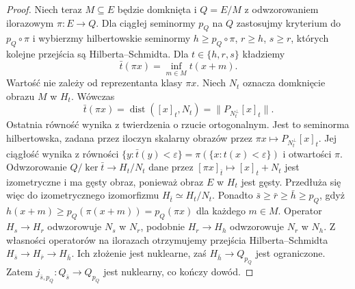 \begin{proof}
Niech teraz $M\subseteq E$ będzie domknięta i
$Q=E/M$ z odwzorowaniem ilorazowym $\pi:E\to Q$.
Dla ciągłej seminormy $p_Q$ na $Q$ zastosujmy kryterium
do $p_Q\circ\pi$ i wybierzmy hilbertowskie seminormy
$h\ge p_Q\circ\pi$, $r\ge h$, $s\ge r$,
których kolejne przejścia są Hilberta--Schmidta.
Dla $t\in\{h,r,s\}$ kładziemy
\[
 \bar t(\pi x)=\inf_{m\in M}t(x+m).
\]
Wartość nie zależy od reprezentanta klasy $\pi x$.
Niech $N_t$ oznacza domknięcie obrazu $M$ w $H_t$.
Wówczas
\[
 \bar t(\pi x)=\operatorname{dist}([x]_t,N_t)
 =\|P_{N_t^\perp}[x]_t\|.
\]
Ostatnia równość wynika z twierdzenia o rzucie
ortogonalnym. Jest to seminorma hilbertowska, zadana
przez iloczyn skalarny obrazów przez
$\pi x\mapsto P_{N_t^\perp}[x]_t$.
Jej ciągłość wynika z równości
$\{y:\bar t(y)<\varepsilon\}=
\pi(\{x:t(x)<\varepsilon\})$ i otwartości $\pi$.
Odwzorowanie $Q/\ker\bar t\to H_t/N_t$ dane przez
$[\pi x]_{\bar t}\mapsto [x]_t+N_t$ jest izometryczne
i ma gęsty obraz, ponieważ obraz $E$ w $H_t$ jest gęsty.
Przedłuża się więc do izometrycznego izomorfizmu
$H_{\bar t}\simeq H_t/N_t$.
Ponadto $\bar s\ge\bar r\ge\bar h\ge p_Q$,
gdyż $h(x+m)\ge p_Q(\pi(x+m))=p_Q(\pi x)$
dla każdego $m\in M$.
Operator $H_s\to H_r$ odwzorowuje $N_s$ w $N_r$,
podobnie $H_r\to H_h$ odwzorowuje $N_r$ w $N_h$.
Z własności operatorów na ilorazach otrzymujemy
przejścia Hilberta--Schmidta
$H_{\bar s}\to H_{\bar r}\to H_{\bar h}$.
Ich złożenie jest nuklearne, zaś
$H_{\bar h}\to Q_{p_Q}$ jest ograniczone. Zatem
$j_{\bar s,p_Q}:Q_{\bar s}\to Q_{p_Q}$ jest nuklearny,
co kończy dowód.
\end{proof}

